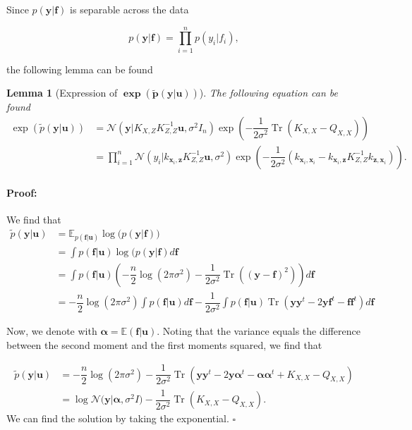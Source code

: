 \documentclass[12pt,a4paper,oneside]{book}
\newtheorem{Lemma}{Lemma}
\newenvironment{proof}{\paragraph{Proof:}}{\hfill$\square$}
\DeclareMathOperator{\Tr}{Tr}
\begin{document}
Since $p(\bm{y}|\bm{f})$ is separable across the data

\begin{equation}
p(\bm{y}|\bm{f}) = \prod_{i=1}^{n} p(y_i|f_i),
\end{equation}


the following lemma can be found

\begin{Lemma}[Expression of $\bm{\exp (\tilde{p}(\bm{y}|\bm{u}) )}$]\label{lemma_bound1}
The following equation can be found 
\begin{align}\label{sparse_var_2}
\exp (\tilde{p}(\bm{y}|\bm{u}) )&= \mathcal{N} (\bm{y}|K_{X,Z} K^{-1}_{Z,Z} \bm{u}, \sigma^2 I_n ) \exp{ \left( -\dfrac{1}{2\sigma^2} \Tr ( K_{X,X} - Q_{X,X} ) \right)} \nonumber \\
&= \prod_{i=1}^n \mathcal{N}(y_i|k_{\bm{x}_i,\bm{z}} K^{-1}_{Z,Z} \bm{u} , \sigma^2) \exp{\left(-\dfrac{1}{2\sigma^2}(k_{\bm{x}_i,\bm{x}_i} - k_{\bm{x}_i,\bm{z}} K^{-1}_{Z,Z}k_{\bm{z},\bm{x}_i}) \right)} .
\end{align}
\end{Lemma}

\begin{proof}
We find that
\begin{align}
\tilde{p}(\bm{y}|\bm{u}) &=  \mathbb{E}_{p(\bm{f}|\bm{u})}\log{(p(\bm{y}|\bm{f})}) \nonumber \\
&= \int p(\bm{f}|\bm{u}) \log (p(\bm{y}|\bm{f})d \bm{f} \nonumber \\
&= \int p(\bm{f}|\bm{u}) \left( -\dfrac{n}{2} \log(2 \pi \sigma^2) - \dfrac{1}{2 \sigma^2} \Tr \left( ( \bm{y} - \bm{f})^2  \right) \right) d\bm{f} \nonumber \\
&=  - \dfrac{n}{2} \log (2 \pi \sigma^2) \int p(\bm{f} | \bm{u}) d\bm{f} - \dfrac{1}{2 \sigma^2} \int p(\bm{f} | \bm{u}) \Tr \left( \bm{y} \bm{y}^t - 2 \bm{y}\bm{f}^t - \bm{f}\bm{f}^t   \right) d\bm{f}
\end{align}

Now, we denote with $\bm{\alpha} = \mathbb{E}(\bm{f}|\bm{u})$. Noting that the variance equals the difference between the second moment and the first moments squared, we find that 

\begin{align}\label{equation_VFE}
\tilde{p}(\bm{y}|\bm{u}) &=  - \dfrac{n}{2} \log (2 \pi \sigma^2) - \dfrac{1}{2 \sigma^2} \Tr \left( \bm{y} \bm{y}^t - 2 \bm{y}\bm{\alpha}^t - \bm{\alpha}\bm{\alpha}^t + K_{X,X} - Q_{X,X}  \right) \nonumber \\ &= \log{ \mathcal{N}(\bm{y} | \bm{\alpha}, \sigma^2 I} ) - \dfrac{1}{2\sigma^2} \Tr (K_{X,X} - Q_{X,X}).
\end{align}
We can find the solution by taking the exponential. 
\end{proof}
\end{document}
